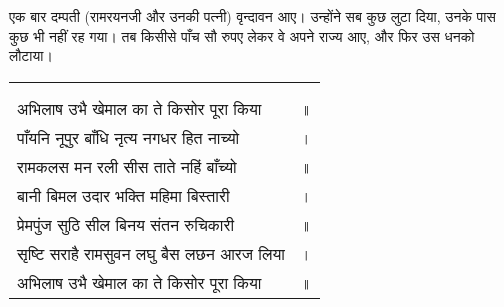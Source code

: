 \begin{sloppypar}\justifying{}
एक बार दम्पती (रामरयनजी और उनकी पत्नी) वृन्दावन आए। उन्होंने सब कुछ लुटा दिया, उनके पास कुछ भी नहीं रह गया। तब किसीसे पाँच सौ रुपए लेकर वे अपने राज्य आए, और फिर उस धनको लौटाया।
\end{sloppypar}


{
{\bfseries
\setlength{\mylenone}{0pt}
\settowidth{\mylentwo}{}
\setlength{\mylenone}{\maxof{\mylenone}{\mylentwo}}
\settowidth{\mylentwo}{अभिलाष उभै खेमाल का ते किसोर पूरा किया}
\setlength{\mylenone}{\maxof{\mylenone}{\mylentwo}}
\settowidth{\mylentwo}{पाँयनि नूपुर बाँधि नृत्य नगधर हित नाच्यो}
\setlength{\mylenone}{\maxof{\mylenone}{\mylentwo}}
\settowidth{\mylentwo}{रामकलस मन रली सीस ताते नहिं बाँच्यो}
\setlength{\mylenone}{\maxof{\mylenone}{\mylentwo}}
\settowidth{\mylentwo}{बानी बिमल उदार भक्ति महिमा बिस्तारी}
\setlength{\mylenone}{\maxof{\mylenone}{\mylentwo}}
\settowidth{\mylentwo}{प्रेमपुंज सुठि सील बिनय संतन रुचिकारी}
\setlength{\mylenone}{\maxof{\mylenone}{\mylentwo}}
\settowidth{\mylentwo}{सृष्टि सराहै रामसुवन लघु बैस लछन आरज लिया}
\setlength{\mylenone}{\maxof{\mylenone}{\mylentwo}}
\settowidth{\mylentwo}{अभिलाष उभै खेमाल का ते किसोर पूरा किया}
\setlength{\mylenone}{\maxof{\mylenone}{\mylentwo}}
\setlength{\mylentwo}{\baselineskip}
\setlength{\mylenone}{\mylenone + 1pt}
\begin{longtable}[l]{@{\hspace*{\mylen}}>{\setlength\parfillskip{0pt}}p{\mylenone}@{}@{}l@{}}
 & \\[-\the\mylentwo]
\centering{॥ १२१ \hspace*{-1.5mm}॥} & \\ \nopagebreak
अभिलाष उभै खेमाल का ते किसोर पूरा किया & ॥\\
पाँयनि नूपुर बाँधि नृत्य नगधर हित नाच्यो & ।\\ \nopagebreak
रामकलस मन रली सीस ताते नहिं बाँच्यो & ॥\\
बानी बिमल उदार भक्ति महिमा बिस्तारी & ।\\ \nopagebreak
प्रेमपुंज सुठि सील बिनय संतन रुचिकारी & ॥\\
सृष्टि सराहै रामसुवन लघु बैस लछन आरज लिया & ।\\ \nopagebreak
अभिलाष उभै खेमाल का ते किसोर पूरा किया & ॥
\end{longtable}
}
}

